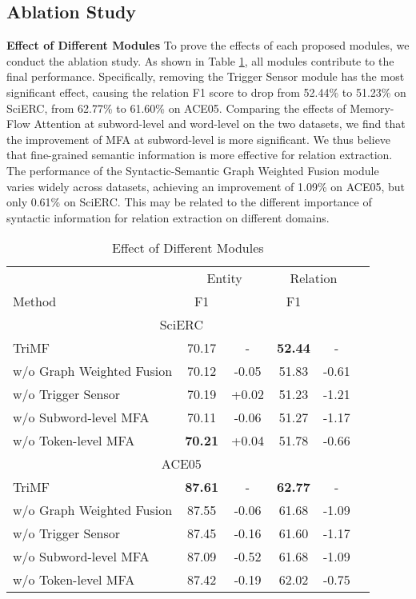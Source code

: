 \documentclass[sigconf]{acmart}
\begin{document}
\subsection{Ablation Study}

\noindent\textbf{Effect of Different Modules}
To prove the effects of each proposed modules, we conduct the ablation study. As shown in Table \ref{tab:as_module}, all modules contribute to the final performance. Specifically, removing the Trigger Sensor module has the most significant effect, causing the relation F1 score to drop from 52.44\% to 51.23\% on SciERC, from 62.77\% to 61.60\% on ACE05. 
Comparing the effects of Memory-Flow Attention at subword-level and word-level on the two datasets, we find that the improvement of MFA at subword-level is more significant. We thus believe that fine-grained semantic information is more effective for relation extraction. The performance of the Syntactic-Semantic Graph Weighted Fusion module varies widely across datasets, achieving an improvement of 1.09\% on ACE05, but only 0.61\% on SciERC. This may be related to the different importance of syntactic information for relation extraction on different domains.
\begin{table}
  \small
  \begin{tabular}{@{}lccccc@{}}
  \toprule
 	& \multicolumn{2}{c}{Entity} & \multicolumn{2}{c}{Relation} \\ 
 	\cmidrule(lr){2-3} \cmidrule(lr){4-5}
 	Method & F1 &  & F1 &  \\ \midrule
 	\multicolumn{5}{c}{SciERC} \\ \midrule
 	TriMF & 70.17 & - & \textbf{52.44} & - \\
 	\quad w/o Graph Weighted Fusion & 70.12 & -0.05 & 51.83 & -0.61 \\ 
 	\quad w/o Trigger Sensor  & 70.19 & +0.02 & 51.23 & -1.21 \\ 
 	\quad w/o Subword-level MFA  & 70.11 & -0.06 & 51.27 & -1.17 \\
 	\quad w/o Token-level MFA  & \textbf{70.21} & +0.04 & 51.78 & -0.66 \\\midrule
  	\multicolumn{5}{c}{ACE05} \\ \midrule
 	TriMF & \textbf{87.61} & - & \textbf{62.77} & - \\
  	\quad w/o Graph Weighted Fusion & 87.55 & -0.06 & 61.68 & -1.09 \\
 	\quad w/o Trigger Sensor  & 87.45 & -0.16 & 61.60 & -1.17 \\
 	\quad w/o Subword-level MFA  & 87.09 & -0.52 & 61.68 & -1.09 \\
 	\quad w/o Token-level MFA  & 87.42 & -0.19 & 62.02 & -0.75 \\
   \bottomrule
 \end{tabular}
 \caption{Effect of Different Modules}
 \label{tab:as_module}
\end{table}
\end{document}
